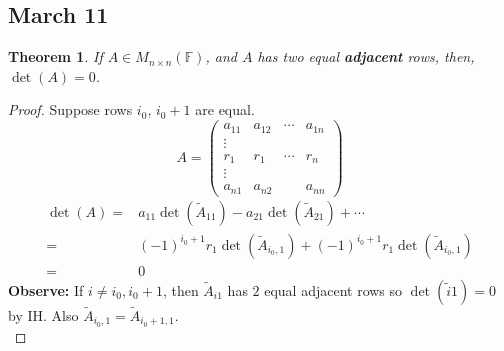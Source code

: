 \documentclass[12pt]{article}
\newtheorem{theorem}{Theorem}[subsection]
\newcommand{\mF}{{\mathbb{F}}}
\begin{document}
\subsection{March 11}
\begin{theorem}
	If $A \in M_{n\times n}(\mF)$, and $A$ has two equal \textbf{adjacent} rows,
	then, $\det(A) = 0$. 
\end{theorem}
\begin{proof}
	Suppose rows $i_0$, $i_{0}+1$ are equal. 
	\[
		A = 
		\begin{pmatrix}
			a_{11} & a_{12} & \cdots & a_{1n}	\\
			\vdots &		&		 &			\\
			r_1	   & r_1	& \cdots & r_n		\\
			\vdots &		&		 &			\\
			a_{n1} & a_{n2}	&		 & a_{nn}	
		\end{pmatrix}
	\]
	\begin{align*}
		\det(A) 
		=& a_{11} \det(\tilde A_{11}) - a_{21} \det(\tilde A_{21}) + \cdots	\\
		=& (-1)^{i_0+1} r_1\det(\tilde A_{i_0, 1}) 
		+ (-1)^{i_0+1} r_1\det(\tilde A_{i_0, 1})	\\
		=& 0
	\end{align*}
	\textbf{Observe: }
	If $i \neq i_0, i_0 + 1$, then $\tilde A_{i1}$ has $2$ equal adjacent rows
	so $\det(\tilde i1) = 0$ by IH. 
	Also $\tilde A_{i_0, 1} = \tilde A_{i_0+1, 1}$.		\\
\end{proof}
\end{document}

